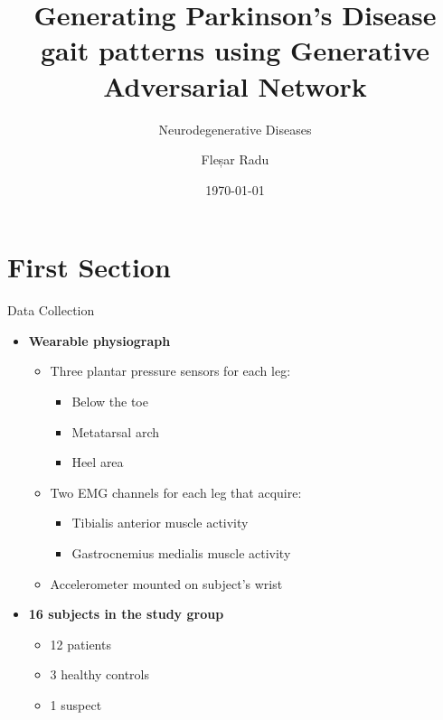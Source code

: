 \documentclass[aspectratio=169,xcolor=dvipsnames]{beamer}
\title{Generating Parkinson’s Disease gait patterns using Generative Adversarial Network}
\subtitle{Neurodegenerative Diseases}
\author{Fleșar Radu}
\institute
{
    West University of Timișoara
}
\date{\today} %
\begin{document}
\begin{frame}
    \titlepage
\end{frame}

\section{First Section}

\begin{frame}{Data Collection}
\begin{itemize}
    \item \textbf{Wearable physiograph}
    \begin{itemize}
        \item Three plantar pressure sensors for each leg:
        \begin{itemize}
            \item Below the toe
            \item Metatarsal arch
            \item Heel area
        \end{itemize}
        \item Two EMG channels for each leg that acquire:
        \begin{itemize}
            \item Tibialis anterior muscle activity
            \item Gastrocnemius medialis muscle activity
        \end{itemize}
        \item Accelerometer mounted on subject’s wrist
    \end{itemize}
    \item \textbf{16 subjects in the study group}
    \begin{itemize}
        \item 12 patients
        \item 3 healthy controls
        \item 1 suspect
    \end{itemize}
\end{itemize}

\end{frame}

\end{document}
